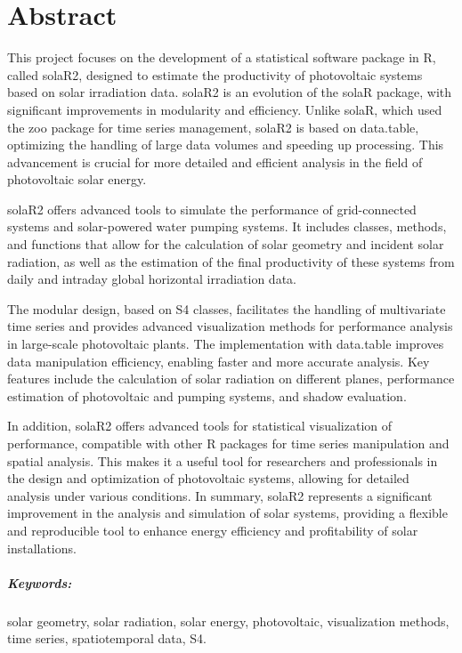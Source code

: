 \chapter*{Abstract}
This project focuses on the development of a statistical software package in R, called solaR2, designed to estimate the productivity of photovoltaic systems based on solar irradiation data. solaR2 is an evolution of the solaR package, with significant improvements in modularity and efficiency. Unlike solaR, which used the zoo package for time series management, solaR2 is based on data.table, optimizing the handling of large data volumes and speeding up processing. This advancement is crucial for more detailed and efficient analysis in the field of photovoltaic solar energy.

solaR2 offers advanced tools to simulate the performance of grid-connected systems and solar-powered water pumping systems. It includes classes, methods, and functions that allow for the calculation of solar geometry and incident solar radiation, as well as the estimation of the final productivity of these systems from daily and intraday global horizontal irradiation data.

The modular design, based on S4 classes, facilitates the handling of multivariate time series and provides advanced visualization methods for performance analysis in large-scale photovoltaic plants. The implementation with data.table improves data manipulation efficiency, enabling faster and more accurate analysis. Key features include the calculation of solar radiation on different planes, performance estimation of photovoltaic and pumping systems, and shadow evaluation.

In addition, solaR2 offers advanced tools for statistical visualization of performance, compatible with other R packages for time series manipulation and spatial analysis. This makes it a useful tool for researchers and professionals in the design and optimization of photovoltaic systems, allowing for detailed analysis under various conditions. In summary, solaR2 represents a significant improvement in the analysis and simulation of solar systems, providing a flexible and reproducible tool to enhance energy efficiency and profitability of solar installations.

\paragraph{Keywords:}
solar geometry, solar radiation, solar energy, photovoltaic, visualization methods, time series, spatiotemporal data, S4.
